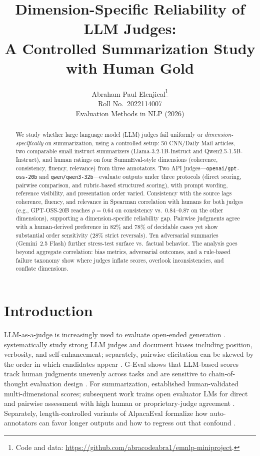 \documentclass[11pt]{article}
\title{Dimension-Specific Reliability of LLM Judges:\\
  A Controlled Summarization Study with Human Gold}
\author{Abraham Paul Elenjical\thanks{Code and data: \url{https://github.com/abracodeabra1/emnlp-miniproject}.} \\
  Roll No.\ 2022114007 \\
  Evaluation Methods in NLP (2026)}
\begin{document}
\maketitle

\begin{abstract}
We study whether large language model (LLM) judges fail uniformly or \emph{dimension-specifically} on summarization, using a controlled setup: 50 CNN/Daily Mail articles, two comparable small instruct summarizers (Llama-3.2-1B-Instruct and Qwen2.5-1.5B-Instruct), and human ratings on four SummEval-style dimensions (coherence, consistency, fluency, relevance) from three annotators. Two API judges---\texttt{openai/gpt-oss-20b} and \texttt{qwen/qwen3-32b}---evaluate outputs under three protocols (direct scoring, pairwise comparison, and rubric-based structured scoring), with prompt wording, reference visibility, and presentation order varied. Consistency with the source lags coherence, fluency, and relevance in Spearman correlation with humans for both judges (e.g., GPT-OSS-20B reaches $\rho{=}0.64$ on consistency vs.\ $0.84$--$0.87$ on the other dimensions), supporting a dimension-specific reliability gap. Pairwise judgments agree with a human-derived preference in 82\% and 78\% of decidable cases yet show substantial order sensitivity (28\% strict reversals). Ten adversarial summaries (Gemini~2.5 Flash) further stress-test surface vs.\ factual behavior. The analysis goes beyond aggregate correlation: bias metrics, adversarial outcomes, and a rule-based failure taxonomy show where judges inflate scores, overlook inconsistencies, and conflate dimensions.
\end{abstract}

\section{Introduction}

LLM-as-a-judge is increasingly used to evaluate open-ended generation \citep{gu2024survey}. \citet{zheng2023judging} systematically study strong LLM judges and document biases including position, verbosity, and self-enhancement; separately, pairwise elicitation can be skewed by the order in which candidates appear \citep{wang2024largebench}. G-Eval shows that LLM-based scores track human judgments unevenly across tasks and are sensitive to chain-of-thought evaluation design \citep{liu2023geval}. For summarization, \citet{fabbri2021summeval} established human-validated multi-dimensional scores; subsequent work trains open evaluator LMs for direct and pairwise assessment with high human or proprietary-judge agreement \citep{kim2024prometheus2,zhu2024judgelm}. Separately, length-controlled variants of AlpacaEval formalize how auto-annotators can favor longer outputs and how to regress out that confound \citep{dubois2024length}.
\end{document}
